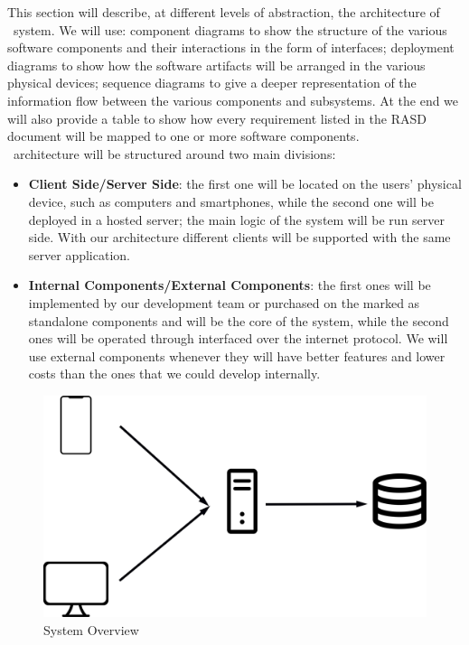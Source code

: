 This section will describe, at different levels of abstraction, the architecture of \projectname~system. We will use: component diagrams to show the structure of the various software components and their interactions in the form of interfaces; deployment diagrams to show how the software artifacts will be arranged in the various physical devices; sequence diagrams to give a deeper representation of the information flow between the various components and subsystems. At the end we will also provide a table to show how every requirement listed in the RASD document will be mapped to one or more software components. \\
\projectname~architecture will be structured around two main divisions:
\begin{itemize}
\item \textbf{Client Side/Server Side}: the first one will be located on the users' physical device, such as computers and smartphones, while the second one will be deployed in a hosted server; the main logic of the system will be run server side. With our architecture different clients will be supported with the same server application.
\item \textbf{Internal Components/External Components}: the first ones will be implemented by our development team or purchased on the marked as standalone components and will be the core of the system, while the second ones will be operated through interfaced over the internet protocol. We will use external components whenever they will have better features and lower costs than the ones that we could develop internally.
\end{itemize}

\begin{figure}[h]
	\centering\includegraphics[scale = 0.1]{Images/AppServDb.png}
	\caption{System Overview}
\end{figure}